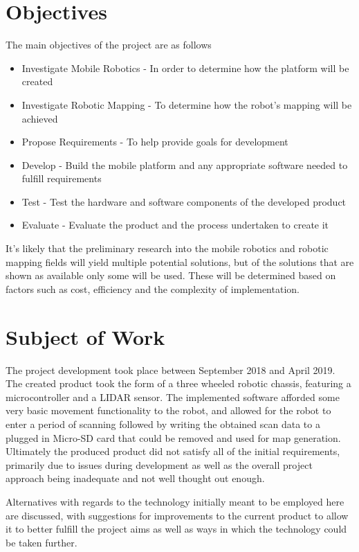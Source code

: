 	\section{Objectives}
	The main objectives of the project are as follows
	\begin{itemize}
		\item Investigate Mobile Robotics - In order to determine how the platform will be created
		\item Investigate Robotic Mapping - To determine how the robot's mapping will be achieved
		\item Propose Requirements - To help provide goals for development
		\item Develop - Build the mobile platform and any appropriate software needed to fulfill requirements
		\item Test - Test the hardware and software components of the developed product
		\item Evaluate - Evaluate the product and the process undertaken to create it
	\end{itemize}

	It's likely that the preliminary research into the mobile robotics and robotic mapping fields will yield multiple potential solutions, but of the solutions that are shown as available only some will be used. These will be determined based on factors such as cost, efficiency and the complexity of implementation.

	\section{Subject of Work}
	The project development took place between September 2018 and April 2019. The created product took the form of a three wheeled robotic chassis, featuring a microcontroller and a LIDAR sensor. The implemented software afforded some very basic movement functionality to the robot, and allowed for the robot to enter a period of scanning followed by writing the obtained scan data to a plugged in Micro-SD card that could be removed and used for map generation. Ultimately the produced product did not satisfy all of the initial requirements, primarily due to issues during development as well as the overall project approach being inadequate and not well thought out enough.
	
	Alternatives with regards to the technology initially meant to be employed here are discussed, with suggestions for improvements to the current product to allow it to better fulfill the project aims as well as ways in which the technology could be taken further.
	
